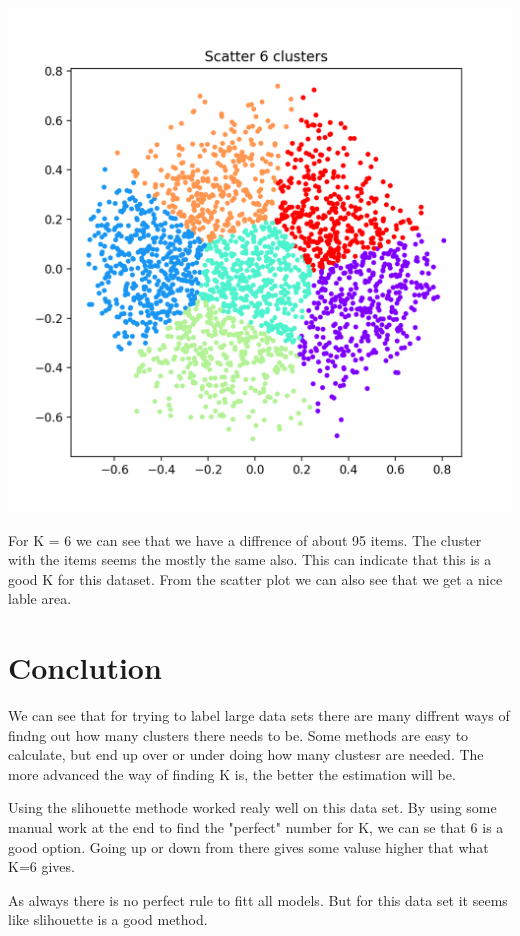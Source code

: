 \documentclass[10pt]{article}
\begin{document}
    \begin{center}
        \includegraphics[scale=0.5]{scatter_6.png}
    \end{center}

    For K = 6 we can see that we have a diffrence of about 95 items. The cluster with the items seems the mostly the same also. This can indicate that this is a good K for this dataset. From the scatter plot we can also see that we get a nice lable area.

    \section{Conclution}
    We can see that for trying to label large data sets there are many diffrent ways of findng out how many clusters there needs to be. Some methods are easy to calculate, but end up over or under doing how many clustesr are needed. The more advanced the way of finding K is, the better the estimation will be. 

    Using the slihouette methode worked realy well on this data set. By using some manual work at the end to find the "perfect" number for K, we can se that 6 is a good option. Going up or down from there gives some valuse higher that what K=6 gives.

    As always there is no perfect rule to fitt all models. But for this data set it seems like slihouette is a good method.
\end{document}
